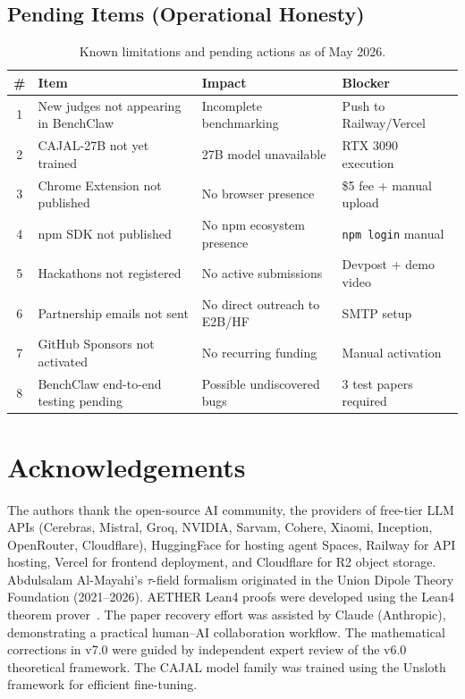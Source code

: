 \documentclass[11pt,a4paper]{article}
\theoremstyle{plain}
\theoremstyle{definition}
\theoremstyle{remark}
\begin{document}
\subsection{Pending Items (Operational Honesty)}

\begin{table}[ht]
\centering
\caption{Known limitations and pending actions as of May 2026.}
\label{tab:pending}
\small\begin{tabular}{@{}clp{5cm}l@{}}
\toprule
\textbf{\#} & \textbf{Item} & \textbf{Impact} & \textbf{Blocker} \\
\midrule
1 & New judges not appearing in BenchClaw  & Incomplete benchmarking          & Push to Railway/Vercel \\
2 & CAJAL-27B not yet trained              & 27B model unavailable            & RTX 3090 execution \\
3 & Chrome Extension not published         & No browser presence              & \$5 fee + manual upload \\
4 & npm SDK not published                  & No npm ecosystem presence        & \texttt{npm login} manual \\
5 & Hackathons not registered              & No active submissions            & Devpost + demo video \\
6 & Partnership emails not sent            & No direct outreach to E2B/HF     & SMTP setup \\
7 & GitHub Sponsors not activated          & No recurring funding             & Manual activation \\
8 & BenchClaw end-to-end testing pending   & Possible undiscovered bugs       & 3 test papers required \\
\bottomrule
\end{tabular}
\end{table}

\section*{Acknowledgements}

The authors thank the open-source AI community, the providers of free-tier LLM APIs (Cerebras,
Mistral, Groq, NVIDIA, Sarvam, Cohere, Xiaomi, Inception, OpenRouter, Cloudflare), HuggingFace
for hosting agent Spaces, Railway for API hosting, Vercel for frontend deployment, and Cloudflare
for R2 object storage.  Abdulsalam Al-Mayahi's $\tau$-field formalism originated in the Union
Dipole Theory Foundation (2021--2026).  AETHER Lean4 proofs were developed using the Lean4
theorem prover~\cite{lean4}.  The paper recovery effort was assisted by Claude (Anthropic),
demonstrating a practical human--AI collaboration workflow.  The mathematical corrections in
v7.0 were guided by independent expert review of the v6.0 theoretical framework.  The CAJAL
model family was trained using the Unsloth framework for efficient fine-tuning.
\end{document}
